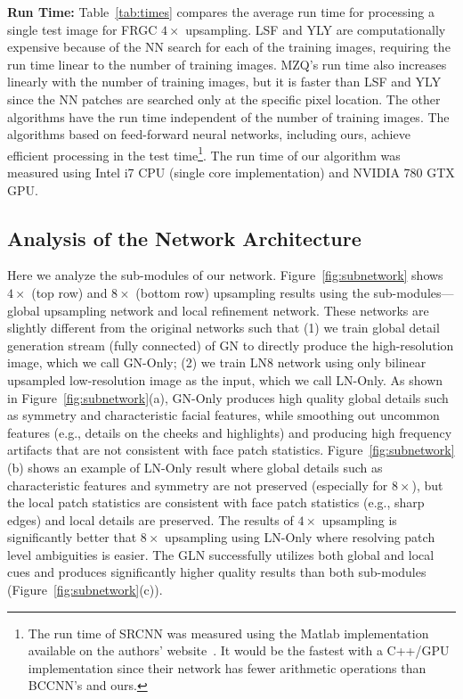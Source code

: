 \documentclass[runningheads]{llncs}
\begin{document}
{\bf Run Time:}
Table~\ref{tab:times} compares the average run time for processing a single test image for FRGC $4\times$ upsampling. LSF and YLY are computationally expensive because of the NN search for each of the training images, requiring the run time linear to the number of training images.
MZQ's run time also increases linearly with the number of training images, but it is faster than LSF and YLY since the NN patches are searched only at the specific pixel location. The other algorithms have the run time independent of the number of training images. The algorithms based on feed-forward neural networks, including ours, achieve efficient processing in the test time\footnote{The run time of SRCNN was measured using the Matlab implementation available on the authors' website~\cite{Dong15PAMI}. It would be the fastest with a C++/GPU implementation since their network has fewer arithmetic operations than BCCNN's and ours.}. The run time of our algorithm was measured using Intel i7 CPU (single core implementation) and NVIDIA 780 GTX GPU.




\subsection{Analysis of the Network Architecture} \label{sec:analysis}

Here we analyze the sub-modules of our network. Figure~\ref{fig:subnetwork} shows $4 \times$ (top row) and $8 \times$ (bottom row) upsampling results using the sub-modules---global upsampling network and local refinement network. These networks are slightly different from the original networks such that (1) we train global detail generation stream (fully connected) of GN to directly produce the high-resolution image, which we call GN-Only; (2) we train LN8 network using only bilinear upsampled low-resolution image as the input, which we call LN-Only. As shown in Figure~\ref{fig:subnetwork}(a), GN-Only produces high quality global details such as symmetry and characteristic facial features, while smoothing out uncommon features (e.g., details on the cheeks and highlights) and producing high frequency artifacts that are not consistent with face patch statistics. Figure~\ref{fig:subnetwork}(b) shows an example of LN-Only result where global details such as characteristic features and symmetry are not preserved (especially for $8 \times$), but the local patch statistics are consistent with face patch statistics (e.g., sharp edges) and local details are preserved. The results of $4 \times$ upsampling is significantly better that $8 \times$ upsampling using LN-Only where resolving patch level ambiguities is easier. The GLN successfully utilizes both global and local cues and produces significantly higher quality results than both sub-modules (Figure~\ref{fig:subnetwork}(c)).
\end{document}
